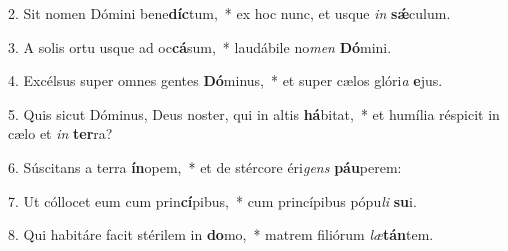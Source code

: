 2. Sit nomen Dómini bene\textbf{díc}tum,~*  ex hoc nunc, et usque \textit{in} \textbf{sǽ}culum.\

3. A solis ortu usque ad oc\textbf{cá}sum,~*  laudábile no\textit{men} \textbf{Dó}mini.\

4. Excélsus super omnes gentes \textbf{Dó}minus,~*  et super cælos glóri\textit{a} \textbf{e}jus.\

5. Quis sicut Dóminus, Deus noster, qui in altis \textbf{há}bitat,~*  et humília réspicit in cælo et \textit{in} \textbf{ter}ra?\

6. Súscitans a terra \textbf{ín}opem,~*  et de stércore éri\textit{gens} \textbf{páu}perem:\

7. Ut cóllocet eum cum prin\textbf{cí}pibus,~*  cum princípibus pópu\textit{li} \textbf{su}i.\

8. Qui habitáre facit stérilem in \textbf{do}mo,~*  matrem filiórum \textit{læ}\textbf{tán}tem.\

